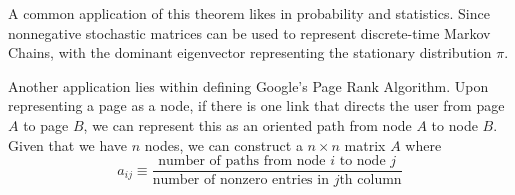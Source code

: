   A common application of this theorem likes in probability and statistics. Since nonnegative stochastic matrices can be used to represent discrete-time Markov Chains, with the dominant eigenvector representing the stationary distribution $\pi$. 

  Another application lies within defining Google's Page Rank Algorithm. Upon representing a page as a node, if there is one link that directs the user from page $A$ to page $B$, we can represent this as an oriented path from node $A$ to node $B$. Given that we have $n$ nodes, we can construct a $n \times n$ matrix $A$ where 
  \begin{equation}
    a_{i j} \equiv  \frac{\text{number of paths from node $i$ to node $j$}}{\text{number of nonzero entries in $j$th column}}
  \end{equation}

